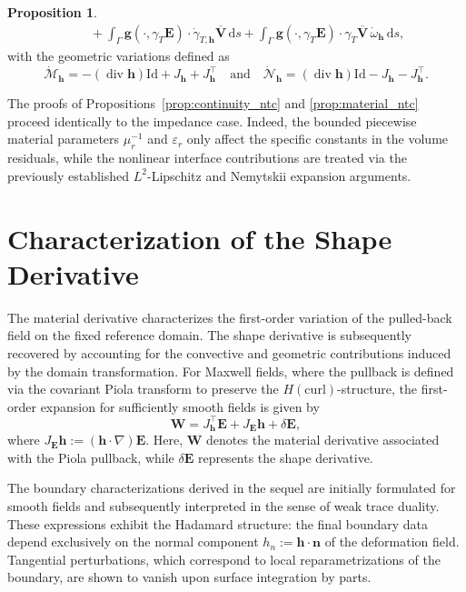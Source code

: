 \documentclass[12pt,reqno]{amsart}
\theoremstyle{definition}
\newtheorem{prop}[theo]{Proposition}
\numberwithin{equation}{section}
\begin{document}
\begin{prop}
\begin{equation}
\begin{aligned}
&\quad + \int_{\Gamma} \mathbf{g}(\cdot, \gamma_T \mathbf{E}) \cdot \dot{\gamma}_{T,\mathbf{h}} \overline{\mathbf{V}} \,\mathrm{d}s + \int_{\Gamma} \mathbf{g}(\cdot, \gamma_T \mathbf{E}) \cdot \gamma_T \overline{\mathbf{V}} \, \dot{\omega}_{\mathbf{h}} \,\mathrm{d}s,
\end{aligned}
\end{equation}
with the geometric variations defined as
\[
\dot{\mathcal{M}}_{\mathbf{h}} = -(\operatorname{div} \mathbf{h})\mathrm{Id} + J_{\mathbf{h}} + J_{\mathbf{h}}^{\top} \quad \text{and} \quad \dot{\mathcal{N}}_{\mathbf{h}} = (\operatorname{div} \mathbf{h})\mathrm{Id} - J_{\mathbf{h}} - J_{\mathbf{h}}^{\top}.
\]
\end{prop}

The proofs of Propositions~\ref{prop:continuity_ntc} and \ref{prop:material_ntc} 
proceed identically to the impedance case. Indeed, the bounded piecewise material 
parameters $\mu_r^{-1}$ and $\varepsilon_r$ only affect the specific constants 
in the volume residuals, while the nonlinear interface contributions are treated 
via the previously established $L^2$-Lipschitz and Nemytskii expansion arguments.


\section{Characterization of the Shape Derivative}
\label{sec:4}

The material derivative characterizes the first-order variation of the pulled-back field on the fixed reference domain. The shape derivative is subsequently recovered by accounting for the convective and geometric contributions induced by the domain transformation. For Maxwell fields, where the pullback is defined via the covariant Piola transform to preserve the $H(\mathrm{curl})$-structure, the first-order expansion for sufficiently smooth fields is given by
\begin{equation}
\label{eq:piola_expansion}
\mathbf{W} = J_{\mathbf{h}}^{\top} \mathbf{E} + J_{\mathbf{E}}\mathbf{h} + \delta \mathbf{E},
\end{equation}
where $J_{\mathbf{E}}\mathbf{h} := (\mathbf{h} \cdot \nabla) \mathbf{E}$. Here, $\mathbf{W}$ denotes the material derivative associated with the Piola pullback, while $\delta \mathbf{E}$ represents the shape derivative.

The boundary characterizations derived in the sequel are initially formulated for smooth fields and subsequently interpreted in the sense of weak trace duality. These expressions exhibit the Hadamard structure: the final boundary data depend exclusively on the normal component $h_n := \mathbf{h} \cdot \mathbf{n}$ of the deformation field. Tangential perturbations, which correspond to local reparametrizations of the boundary, are shown to vanish upon surface integration by parts.
\end{document}
